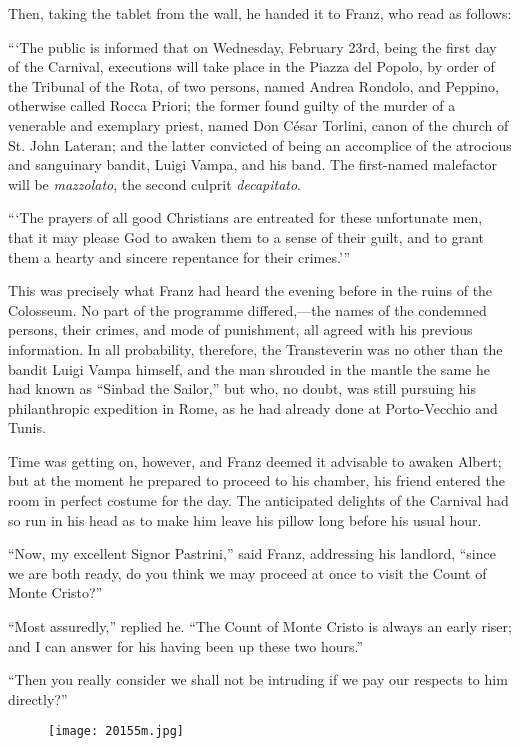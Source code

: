Then, taking the tablet from the wall, he handed it to Franz, who read
as follows:

“‘The public is informed that on Wednesday, February 23rd, being the
first day of the Carnival, executions will take place in the Piazza del
Popolo, by order of the Tribunal of the Rota, of two persons, named
Andrea Rondolo, and Peppino, otherwise called Rocca Priori; the former
found guilty of the murder of a venerable and exemplary priest, named
Don César Torlini, canon of the church of St. John Lateran; and the
latter convicted of being an accomplice of the atrocious and sanguinary
bandit, Luigi Vampa, and his band. The first-named malefactor will be
\textit{mazzolato}, the second culprit \textit{decapitato}.

“‘The prayers of all good Christians are entreated for these
unfortunate men, that it may please God to awaken them to a sense of
their guilt, and to grant them a hearty and sincere repentance for
their crimes.’”

This was precisely what Franz had heard the evening before in the ruins
of the Colosseum. No part of the programme differed,—the names of the
condemned persons, their crimes, and mode of punishment, all agreed
with his previous information. In all probability, therefore, the
Transteverin was no other than the bandit Luigi Vampa himself, and the
man shrouded in the mantle the same he had known as “Sinbad the
Sailor,” but who, no doubt, was still pursuing his philanthropic
expedition in Rome, as he had already done at Porto-Vecchio and Tunis.

Time was getting on, however, and Franz deemed it advisable to awaken
Albert; but at the moment he prepared to proceed to his chamber, his
friend entered the room in perfect costume for the day. The anticipated
delights of the Carnival had so run in his head as to make him leave
his pillow long before his usual hour.

“Now, my excellent Signor Pastrini,” said Franz, addressing his
landlord, “since we are both ready, do you think we may proceed at once
to visit the Count of Monte Cristo?”

“Most assuredly,” replied he. “The Count of Monte Cristo is always an
early riser; and I can answer for his having been up these two hours.”

“Then you really consider we shall not be intruding if we pay our
respects to him directly?”

\begin{figure}[h]
\texttt{[image: 20155m.jpg]}
\end{figure}

